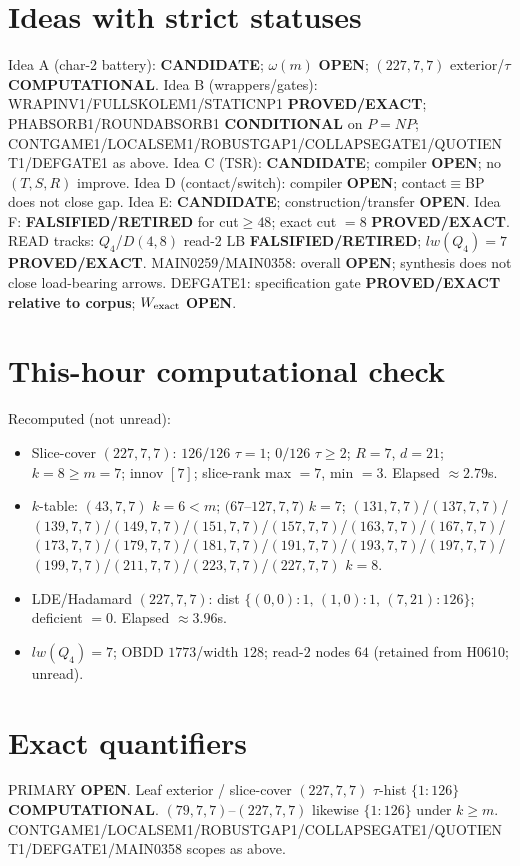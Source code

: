 \documentclass[11pt]{article}
\begin{document}
\section*{Ideas with strict statuses}
Idea A (char-2 battery): \textbf{CANDIDATE}; $\omega(m)$ \textbf{OPEN}; $(227,7,7)$ exterior/$\tau$ \textbf{COMPUTATIONAL}.
Idea B (wrappers/gates): WRAPINV1/FULLSKOLEM1/STATICNP1 \textbf{PROVED/EXACT};
PHABSORB1/ROUNDABSORB1 \textbf{CONDITIONAL} on $P=NP$;
CONTGAME1/LOCALSEM1/ROBUSTGAP1/COLLAPSEGATE1/QUOTIENT1/DEFGATE1 as above.
Idea C (TSR): \textbf{CANDIDATE}; compiler \textbf{OPEN}; no $(T,S,R)$ improve.
Idea D (contact/switch): compiler \textbf{OPEN}; contact$\equiv$BP does not close gap.
Idea E: \textbf{CANDIDATE}; construction/transfer \textbf{OPEN}.
Idea F: \textbf{FALSIFIED/RETIRED} for cut$\ge48$; exact cut $=8$ \textbf{PROVED/EXACT}.
READ tracks: $Q_4$/$D(4,8)$ read-$2$ LB \textbf{FALSIFIED/RETIRED}; $lw(Q_4)=7$ \textbf{PROVED/EXACT}.
MAIN0259/MAIN0358: overall \textbf{OPEN}; synthesis does not close load-bearing arrows.
DEFGATE1: specification gate \textbf{PROVED/EXACT relative to corpus}; $W_{\rm exact}$ \textbf{OPEN}.

\section*{This-hour computational check}
Recomputed (not unread):
\begin{itemize}
\item Slice-cover $(227,7,7)$: $126/126$ $\tau{=}1$; $0/126$ $\tau{\ge}2$; $R{=}7$, $d{=}21$;
  $k{=}8{\ge}m{=}7$; innov $[7]$; slice-rank max $=7$, min $=3$. Elapsed $\approx2.79$s.
\item $k$-table: $(43,7,7)$ $k{=}6{<}m$; $(67$--$127,7,7)$ $k{=}7$;
  $(131,7,7)$/$(137,7,7)$/$(139,7,7)$/$(149,7,7)$/$(151,7,7)$/$(157,7,7)$/$(163,7,7)$/$(167,7,7)$/$(173,7,7)$/$(179,7,7)$/$(181,7,7)$/$(191,7,7)$/$(193,7,7)$/$(197,7,7)$/$(199,7,7)$/$(211,7,7)$/$(223,7,7)$/$(227,7,7)$ $k{=}8$.
\item LDE/Hadamard $(227,7,7)$: dist $\{(0,0){:}1,\,(1,0){:}1,\,(7,21){:}126\}$; deficient $=0$. Elapsed $\approx3.96$s.
\item $lw(Q_4)=7$; OBDD $1773$/width $128$; read-$2$ nodes $64$ (retained from H0610; unread).
\end{itemize}

\section*{Exact quantifiers}
PRIMARY \textbf{OPEN}. Leaf exterior / slice-cover $(227,7,7)$ $\tau$-hist $\{1{:}126\}$ \textbf{COMPUTATIONAL}.
$(79,7,7)$--$(227,7,7)$ likewise $\{1{:}126\}$ under $k{\ge}m$. CONTGAME1/LOCALSEM1/ROBUSTGAP1/COLLAPSEGATE1/QUOTIENT1/DEFGATE1/MAIN0358 scopes as above.
\end{document}
